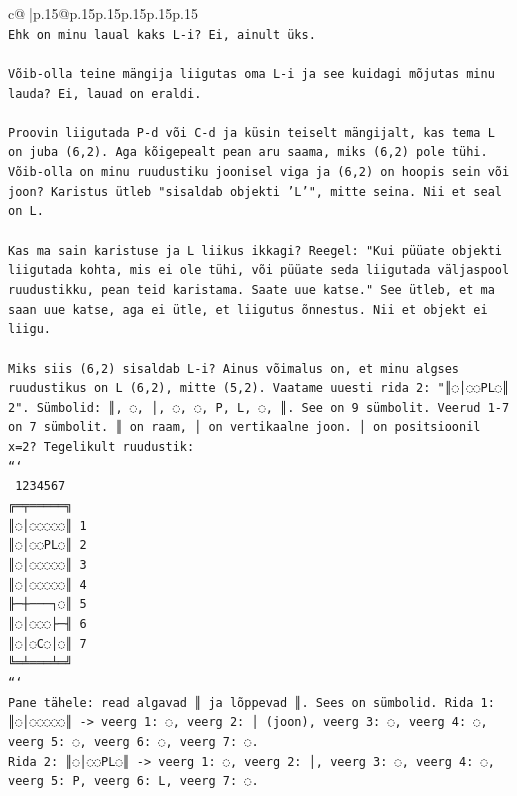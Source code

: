 \documentclass{article}
\begin{document}
{\begin{supertabular}{c@{$\;$}|p{.15\linewidth}@{}p{.15\linewidth}p{.15\linewidth}p{.15\linewidth}p{.15\linewidth}p{.15\linewidth}}
{{{\\ 
\texttt{Ehk on minu laual kaks L{-}i? Ei, ainult üks.} \\
\\ 
\texttt{Võib{-}olla teine mängija liigutas oma L{-}i ja see kuidagi mõjutas minu lauda? Ei, lauad on eraldi.} \\
\\ 
\texttt{Proovin liigutada P{-}d või C{-}d ja küsin teiselt mängijalt, kas tema L on juba (6,2). Aga kõigepealt pean aru saama, miks (6,2) pole tühi. Võib{-}olla on minu ruudustiku joonisel viga ja (6,2) on hoopis sein või joon? Karistus ütleb "sisaldab objekti 'L'", mitte seina. Nii et seal on L.} \\
\\ 
\texttt{Kas ma sain karistuse ja L liikus ikkagi? Reegel: "Kui püüate objekti liigutada kohta, mis ei ole tühi, või püüate seda liigutada väljaspool ruudustikku, pean teid karistama. Saate uue katse." See ütleb, et ma saan uue katse, aga ei ütle, et liigutus õnnestus. Nii et objekt ei liigu.} \\
\\ 
\texttt{Miks siis (6,2) sisaldab L{-}i? Ainus võimalus on, et minu algses ruudustikus on L (6,2), mitte (5,2). Vaatame uuesti rida 2: "║◌│◌◌PL◌║ 2". Sümbolid: ║, ◌, │, ◌, ◌, P, L, ◌, ║. See on 9 sümbolit. Veerud 1{-}7 on 7 sümbolit. ║ on raam, │ on vertikaalne joon. │ on positsioonil x=2? Tegelikult ruudustik:} \\
\texttt{```} \\
\texttt{ 1234567} \\
\texttt{╔═╤═════╗} \\
\texttt{║◌│◌◌◌◌◌║ 1} \\
\texttt{║◌│◌◌PL◌║ 2} \\
\texttt{║◌│◌◌◌◌◌║ 3} \\
\texttt{║◌│◌◌◌◌◌║ 4} \\
\texttt{╟─┼───┐◌║ 5} \\
\texttt{║◌│◌◌◌├─╢ 6} \\
\texttt{║◌│◌C◌│◌║ 7} \\
\texttt{╚═╧═══╧═╝} \\
\texttt{```} \\
\texttt{Pane tähele: read algavad ║ ja lõppevad ║. Sees on sümbolid. Rida 1: ║◌│◌◌◌◌◌║ {-}> veerg 1: ◌, veerg 2: │ (joon), veerg 3: ◌, veerg 4: ◌, veerg 5: ◌, veerg 6: ◌, veerg 7: ◌.} \\
\texttt{Rida 2: ║◌│◌◌PL◌║ {-}> veerg 1: ◌, veerg 2: │, veerg 3: ◌, veerg 4: ◌, veerg 5: P, veerg 6: L, veerg 7: ◌.} \\
}}}
\end{supertabular}}
\end{document}
